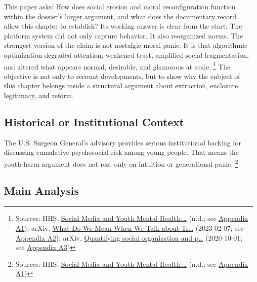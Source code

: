 \documentclass[
  american,
  11pt,
  letterpaper,
]{article}
\begin{document}
This paper asks: How does social erosion and moral reconfiguration
function within the dossier's larger argument, and what does the
documentary record allow this chapter to establish? Its working answer
is clear from the start: The platform system did not only capture
behavior. It also reorganized norms. The strongest version of the claim
is not nostalgic moral panic. It is that algorithmic optimization
degraded attention, weakened trust, amplified social fragmentation, and
altered what appears normal, desirable, and glamorous at scale.
\footnote{Sources: HHS,
  \href{https://www.hhs.gov/surgeongeneral/priorities/youth-mental-health/social-media/index.html}{Social
  Media and Youth Mental Health:\ldots{}} (n.d.; see
  \hyperref[appendix-a1-social-media-and-youth-mental-health-the-u-s-surgeon-general-s-advisory]{Appendix
  A1}); arXiv, \href{https://arxiv.org/abs/2302.03671}{What Do We Mean
  When We Talk about Tr\ldots{}} (2023-02-07; see
  \hyperref[appendix-a2-what-do-we-mean-when-we-talk-about-trust-in-social-media-a-systematic-review]{Appendix
  A2}); arXiv, \href{https://arxiv.org/abs/2010.00590}{Quantifying
  social organization and p\ldots{}} (2020-10-01; see
  \hyperref[appendix-a3-quantifying-social-organization-and-political-polarization-in-online-platforms]{Appendix
  A3})} The objective is not only to recount developments, but to show
why the subject of this chapter belongs inside a structural argument
about extraction, enclosure, legitimacy, and reform.

\subsection{Historical or Institutional
Context}\label{historical-or-institutional-context}

The U.S. Surgeon General's advisory provides serious institutional
backing for discussing cumulative psychosocial risk among young people.
That means the youth-harm argument does not rest only on intuition or
generational panic. \footnote{Sources: HHS,
  \href{https://www.hhs.gov/surgeongeneral/priorities/youth-mental-health/social-media/index.html}{Social
  Media and Youth Mental Health:\ldots{}} (n.d.; see
  \hyperref[appendix-a1-social-media-and-youth-mental-health-the-u-s-surgeon-general-s-advisory]{Appendix
  A1})}

\subsection{Main Analysis}\label{main-analysis}
\end{document}

